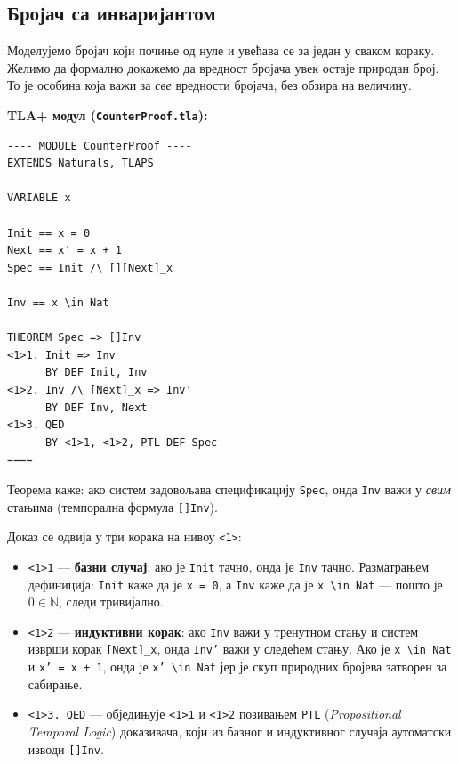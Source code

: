 \subsection{Бројач са инваријантом}

Моделујемо бројач који почиње од нуле и увећава се за један у сваком кораку.
Желимо да формално докажемо да вредност бројача увек остаје природан број.
То је особина која важи за \emph{све} вредности бројача, без обзира на величину.

\begin{primer}

\textbf{TLA+ модул (\texttt{CounterProof.tla}):}
\begin{lstlisting}
---- MODULE CounterProof ----
EXTENDS Naturals, TLAPS

VARIABLE x

Init == x = 0
Next == x' = x + 1
Spec == Init /\ [][Next]_x

Inv == x \in Nat

THEOREM Spec => []Inv
<1>1. Init => Inv
      BY DEF Init, Inv
<1>2. Inv /\ [Next]_x => Inv'
      BY DEF Inv, Next
<1>3. QED
      BY <1>1, <1>2, PTL DEF Spec
====
\end{lstlisting}

Теорема каже: ако систем задовољава спецификацију \texttt{Spec}, онда \texttt{Inv} важи у
\emph{свим} стањима (темпорална формула \texttt{[]Inv}).

Доказ се одвија у три корака на нивоу \texttt{<1>}:
\begin{itemize}
    \item \texttt{<1>1} --- \textbf{базни случај}: ако је \texttt{Init} тачно, онда је \texttt{Inv} тачно.
    Разматрањем дефиниција: \texttt{Init} каже да је \texttt{x = 0}, а \texttt{Inv} каже да је \texttt{x \textbackslash in Nat} --- пошто је $0 \in \mathbb{N}$, следи тривијално.

    \item \texttt{<1>2} --- \textbf{индуктивни корак}: ако \texttt{Inv} важи у тренутном стању и
    систем изврши корак \texttt{[Next]\_x}, онда \texttt{Inv'} важи у следећем стању.
    Ако је \texttt{x \textbackslash in Nat} и \texttt{x' = x + 1}, онда је \texttt{x' \textbackslash in Nat} јер је скуп природних бројева затворен за сабирање.

    \item \texttt{<1>3. QED} --- обједињује \texttt{<1>1} и \texttt{<1>2} позивањем \texttt{PTL}
    (\textit{Propositional Temporal Logic}) доказивача, који из базног и индуктивног случаја аутоматски изводи \texttt{[]Inv}.
\end{itemize}


\end{primer}
